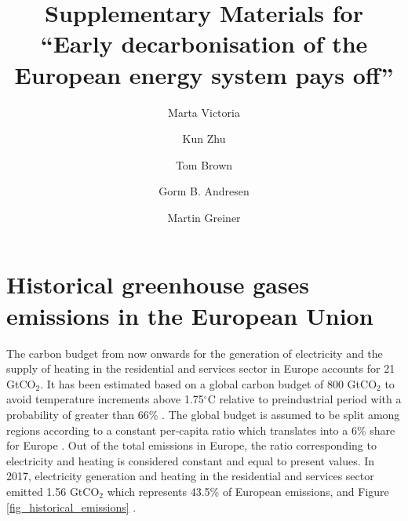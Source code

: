 \documentclass[3p]{elsarticle} %
\begin{document}
\begin{frontmatter}

\title{Supplementary Materials for ``Early decarbonisation of the European energy system pays off'' }

\author[mymainaddress,iClimate]{Marta Victoria}
\author[mymainaddress]{Kun Zhu}
\author[kitaddress]{Tom Brown}
\author[mymainaddress,iClimate]{Gorm B. Andresen}
\author[mymainaddress,iClimate]{Martin Greiner}
\address[mymainaddress]{Department of Engineering, Aarhus University, Inge Lehmanns Gade 10, 8000 Aarhus, Denmark}
\address[iClimate]{iCLIMATE Interdisciplinary Centre for Climate Change, Aarhus University}
\address[kitaddress]{Institute for Automation and Applied Informatics (IAI), Karlsruhe Institute of Technology (KIT), Forschungszentrum 449, 76344, Eggenstein-Leopoldshafen, Germany}








\end{frontmatter}

\section{Historical greenhouse gases emissions in the European Union}

The carbon budget from now onwards for the generation of electricity and the supply of heating in the residential and services sector in Europe accounts for 21 GtCO$_2$. It has been estimated based on a global carbon budget of 800 GtCO$_2$ to avoid temperature increments above 1.75$^{\circ}$C relative to preindustrial period with a probability of greater than 66\% \cite{IPCC_1.5}. The global budget is assumed to be split among regions according to a constant per-capita ratio which translates into a 6\% share for Europe \cite{Raupach_2014}. Out of the total emissions in Europe, the ratio corresponding to electricity and heating is considered constant and equal to present values. In 2017, electricity generation and heating in the residential and services sector emitted 1.56 GtCO$_2$ which represents 43.5\% of European emissions,  \cite{UNFCCC_inventory} and Figure \ref{fig_historical_emissions} . \\
\end{document}
